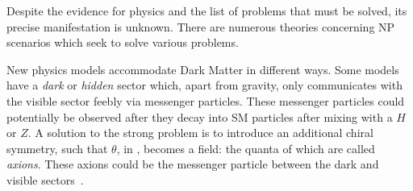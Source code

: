 
Despite the evidence for \bsm physics and the list of problems that must be solved, its precise
manifestation is unknown.
There are numerous theories concerning NP scenarios which seek to solve various problems.

New physics models accommodate Dark Matter in different ways.
Some models have a \emph{dark} or \emph{hidden} sector which, apart from gravity, only
communicates with the visible sector feebly via messenger particles.
These messenger particles could potentially be observed after they decay into SM particles after
mixing with a $H$ or $Z$.
A solution to the strong \CP problem is to introduce an additional chiral symmetry, such that
$\theta$, in , becomes a field: the quanta of which are called \emph{axions}.
These axions could be the messenger particle between the dark and visible
sectors~\cite{Peccei:2006as}.



